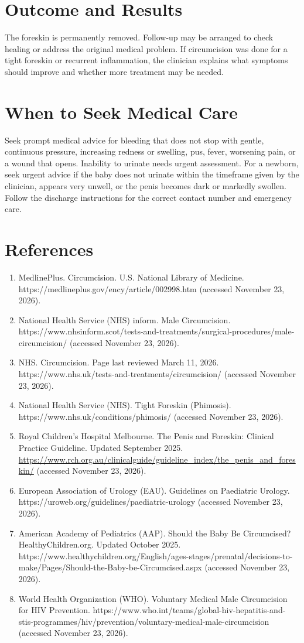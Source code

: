 \section*{Outcome and Results}
The foreskin is permanently removed. Follow-up may be arranged to check healing or address the original medical problem. If circumcision was done for a tight foreskin or recurrent inflammation, the clinician explains what symptoms should improve and whether more treatment may be needed.

\section*{When to Seek Medical Care}
Seek prompt medical advice for bleeding that does not stop with gentle, continuous pressure, increasing redness or swelling, pus, fever, worsening pain, or a wound that opens. Inability to urinate needs urgent assessment. For a newborn, seek urgent advice if the baby does not urinate within the timeframe given by the clinician, appears very unwell, or the penis becomes dark or markedly swollen. Follow the discharge instructions for the correct contact number and emergency care.

\section*{References}
\begin{enumerate}
  \item MedlinePlus. Circumcision. U.S. National Library of Medicine. https://medlineplus.gov/ency/article/002998.htm (accessed November 23, 2026).
  \item National Health Service (NHS) inform. Male Circumcision. https://www.nhsinform.scot/tests-and-treatments/surgical-procedures/male-circumcision/ (accessed November 23, 2026).
  \item NHS. Circumcision. Page last reviewed March 11, 2026. https://www.nhs.uk/tests-and-treatments/circumcision/ (accessed November 23, 2026).
  \item National Health Service (NHS). Tight Foreskin (Phimosis). https://www.nhs.uk/conditions/phimosis/ (accessed November 23, 2026).
  \item Royal Children's Hospital Melbourne. The Penis and Foreskin: Clinical Practice Guideline. Updated September 2025. \url{https://www.rch.org.au/clinicalguide/guideline_index/the_penis_and_foreskin/} (accessed November 23, 2026).
  \item European Association of Urology (EAU). Guidelines on Paediatric Urology. https://uroweb.org/guidelines/paediatric-urology (accessed November 23, 2026).
  \item American Academy of Pediatrics (AAP). Should the Baby Be Circumcised? HealthyChildren.org. Updated October 2025. https://www.healthychildren.org/English/ages-stages/prenatal/decisions-to-make/Pages/Should-the-Baby-be-Circumcised.aspx (accessed November 23, 2026).
  \item World Health Organization (WHO). Voluntary Medical Male Circumcision for HIV Prevention. https://www.who.int/teams/global-hiv-hepatitis-and-stis-programmes/hiv/prevention/voluntary-medical-male-circumcision (accessed November 23, 2026).
\end{enumerate}
\clearpage

